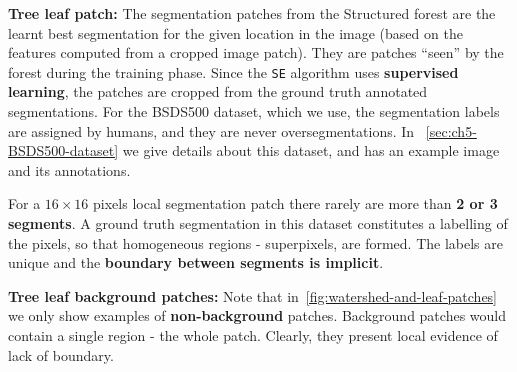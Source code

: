 \textbf{Tree leaf patch:} The segmentation patches from the Structured forest are the learnt best segmentation for the given location in the image (based on the features computed from a cropped image patch). They are patches ``seen'' by the forest during the training phase. Since the {\tt SE} algorithm uses \textbf{supervised learning}, the patches are cropped from the ground truth annotated segmentations. 
For the BSDS500 dataset, which we use, the segmentation labels  are assigned by humans, and they are never oversegmentations. In \textsection~\ref{sec:ch5-BSDS500-dataset} we give details about this dataset, and  has an example image and its annotations.

For a $16\times 16$ pixels local segmentation patch there rarely are more than \textbf{2 or 3 segments}. 
A ground truth segmentation in this dataset constitutes a labelling of the pixels, so that homogeneous regions - superpixels, are formed. The labels are unique and the \textbf{boundary between segments is implicit}.

\textbf{Tree leaf background patches:} Note that in~\ref{fig:watershed-and-leaf-patches} we only show examples of \textbf{non-background} patches. Background patches would contain a single region - the whole patch. Clearly, %
they present local evidence of lack of boundary.

